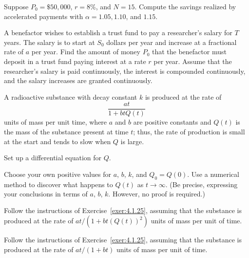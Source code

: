 \begin{exerciselist}
\begin{alist}
    \item %
    Suppose $P_{0}=\$50,000$, $r=8$\%, and $N=15$. Compute the savings realized by accelerated
    payments with $\alpha=1.05,1.10$, and $1.15$.
  \end{alist}

  \item\label{exer:4.1.24} A benefactor wishes to establish a trust fund to pay a researcher's
        salary for $T$ years. The salary is to start at $S_{0}$ dollars per year and increase at a
        fractional rate of $a$ per year. Find the amount of money $P_{0}$ that the benefactor must
        deposit in a trust fund paying interest at a rate $r$ per year. Assume that the researcher's
        salary is paid continuously, the interest is compounded continuously, and the salary
        increases are granted continuously.

  \item\label{exer:4.1.25} \Lex A radioactive substance with decay constant $k$ is produced at the
        rate of
  \[
    \frac{at}{1+btQ(t)}
  \]
  units of mass per unit time, where $a$ and $b$ are positive constants and $Q(t)$ is the mass of
  the substance present at time $t$; thus, the rate of production is small at the start and tends to
  slow when $Q$ is large.
  \begin{alist}
    \item %
    Set up a differential equation for $Q$.

    \item %
    Choose your own positive values for $a$, $b$, $k$, and $Q_{0}=Q(0)$. Use a numerical method to
    discover what happens to $Q(t)$ as $t\to\infty$. (Be precise, expressing your conclusions in
    terms of $a$, $b$, $k$. However, no proof is required.)
  \end{alist}

  \item\label{exer:4.1.26} \Lex Follow the instructions of Exercise~\ref{exer:4.1.25}, assuming that
        the substance is produced at the rate of $at/(1+bt(Q(t))^{2})$ units of mass per unit of
        time.

  \item\label{exer:4.1.27} \Lex Follow the instructions of Exercise~\ref{exer:4.1.25}, assuming that
        the substance is produced at the rate of $at/(1+bt)$ units of mass per unit of time.
\end{exerciselist}
